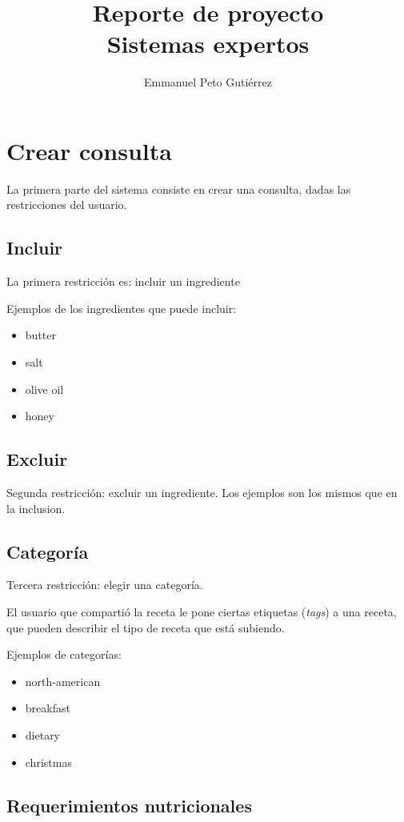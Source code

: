 \documentclass{article}
\title{Reporte de proyecto\\Sistemas expertos}
\author{Emmanuel Peto Gutiérrez}
\begin{document}
\maketitle

\section{Crear consulta}

La primera parte del sistema consiste en crear una consulta, dadas las restricciones del usuario.

\subsection{Incluir}

La primera restricción es: incluir un ingrediente

Ejemplos de los ingredientes que puede incluir:
\begin{itemize}
\item butter
\item salt
\item olive oil
\item honey
\end{itemize}

\subsection{Excluir}

Segunda restricción: excluir un ingrediente. Los ejemplos son los mismos que en la inclusion.

\subsection{Categoría}

Tercera restricción: elegir una categoría.

El usuario que compartió la receta le pone ciertas etiquetas (\textit{tags}) a una receta, que pueden describir el tipo de receta que está subiendo.

Ejemplos de categorías:
\begin{itemize}
\item north-american
\item breakfast
\item dietary
\item christmas
\end{itemize}

\subsection{Requerimientos nutricionales}
\end{document}

